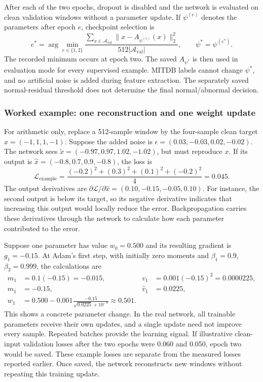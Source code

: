 After each of the two epochs, dropout is disabled and the network is evaluated
on clean validation windows without a parameter update. If $\psi^{(e)}$
denotes the parameters after epoch $e$, checkpoint selection is
\begin{equation}
 e^*=\arg\min_{e\in\{1,2\}}
 \frac{\displaystyle\sum_{x\in\mathcal{A}_{\mathrm{val}}}
 \|x-A_{\psi^{(e)}}(x)\|_2^2}
 {512|\mathcal{A}_{\mathrm{val}}|},\qquad
 \psi^*=\psi^{(e^*)}.
 \label{eq:method-ae-checkpoint-selection}
\end{equation}
The recorded minimum occurs at epoch two. The saved $A_{\psi^*}$ is then
used in evaluation mode for every supervised example. MITDB labels cannot
change $\psi^*$, and no artificial noise is added during feature extraction.
The separately saved normal-residual threshold does not determine the final
normal/abnormal decision.

\subsubsection*{Worked example: one reconstruction and one weight update}

For arithmetic only, replace a 512-sample window by the four-sample clean
target $x=(-1,1,1,-1)$. Suppose the added noise is
$\epsilon=(0.03,-0.03,0.02,-0.02)$. The network sees
$\widetilde x=(-0.97,0.97,1.02,-1.02)$, but must reproduce $x$.
If its output is $\widehat x=(-0.8,0.7,0.9,-0.8)$, the loss is
\begin{equation}
 \mathcal{L}_{\mathrm{example}}=
 \frac{(-0.2)^2+(0.3)^2+(0.1)^2+(-0.2)^2}{4}=0.045.
 \label{eq:method-example-ae-loss}
\end{equation}
The output derivatives are
$\partial\mathcal{L}/\partial\widehat x=(0.10,-0.15,-0.05,0.10)$.
For instance, the second output is below its target, so its negative
derivative indicates that increasing this output would locally reduce the
error. Backpropagation carries these derivatives through the network to
calculate how each parameter contributed to the error.

Suppose one parameter has value $w_0=0.500$ and its resulting gradient is
$g_1=-0.15$. At Adam's first step, with initially zero moments and
$\beta_1=0.9$, $\beta_2=0.999$, the calculations are
\begin{align}
 m_1&=0.1(-0.15)=-0.015,&v_1&=0.001(-0.15)^2=0.0000225,\\
 \widehat m_1&=-0.15,&\widehat v_1&=0.0225,\\
 w_1&=0.500-0.001\frac{-0.15}{\sqrt{0.0225}+10^{-8}}
 \approx0.501.
 \label{eq:method-example-adam-step}
\end{align}
This shows a concrete parameter change. In the real network, all trainable
parameters receive their own updates, and a single update need not improve
every sample. Repeated batches provide the learning signal. If illustrative
clean-input validation losses after the two epochs were 0.060 and 0.050,
epoch two would be saved. These example losses are separate from the measured
losses reported earlier. Once saved, the network reconstructs new windows
without repeating this training update.

